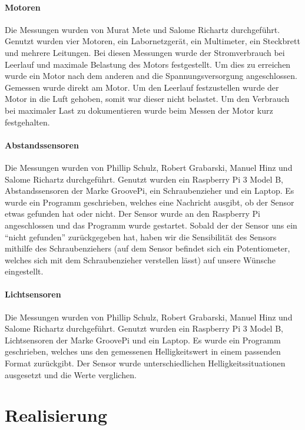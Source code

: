 \documentclass[notitlepage]{report}
\begin{document}
\subsubsection{Motoren}

Die Messungen wurden von Murat Mete und Salome Richartz durchgef\"{u}hrt. Genutzt wurden vier Motoren, ein Labornetzger\"{a}t, ein Multimeter, ein Steckbrett und mehrere Leitungen. Bei diesen Messungen wurde der Stromverbrauch bei Leerlauf und maximale Belastung des Motors festgestellt. Um dies zu erreichen wurde ein Motor nach dem anderen and die Spannungsversorgung angeschlossen. Gemessen wurde direkt am Motor. Um den Leerlauf festzustellen wurde der Motor in die Luft gehoben, somit war dieser nicht belastet. Um den Verbrauch bei maximaler Last zu dokumentieren wurde beim Messen der Motor kurz festgehalten.

\subsubsection{Abstandssensoren}

Die Messungen wurden von Phillip Schulz, Robert Grabarski, Manuel Hinz und Salome Richartz durchgef\"{u}hrt. Genutzt wurden ein Raspberry Pi 3 Model B, Abstandssensoren der Marke GroovePi, ein Schraubenzieher und ein Laptop. Es wurde ein Programm geschrieben, welches eine Nachricht ausgibt, ob der Sensor etwas gefunden hat oder nicht. Der Sensor wurde an den Raspberry Pi angeschlossen und das Programm wurde gestartet. Sobald der der Sensor uns ein “nicht gefunden” zur\"{u}ckgegeben hat, haben wir die Sensibilit\"{a}t des Sensors mithilfe des Schraubenziehers (auf dem Sensor befindet sich ein Potentiometer, welches sich mit dem Schraubenzieher verstellen l\"{a}sst) auf unsere W\"{u}nsche eingestellt.

\subsubsection{Lichtsensoren}

Die Messungen wurden von Phillip Schulz, Robert Grabarski, Manuel Hinz und Salome Richartz durchgef\"{u}hrt. Genutzt wurden ein Raspberry Pi 3 Model B, Lichtsensoren der Marke GroovePi und ein Laptop. Es wurde ein Programm geschrieben, welches uns den gemessenen Helligkeitswert in einem passenden Format zur\"{u}ckgibt. Der Sensor wurde unterschiedlichen Helligkeitssituationen ausgesetzt und die Werte verglichen.


\chapter{Realisierung}
\end{document}
